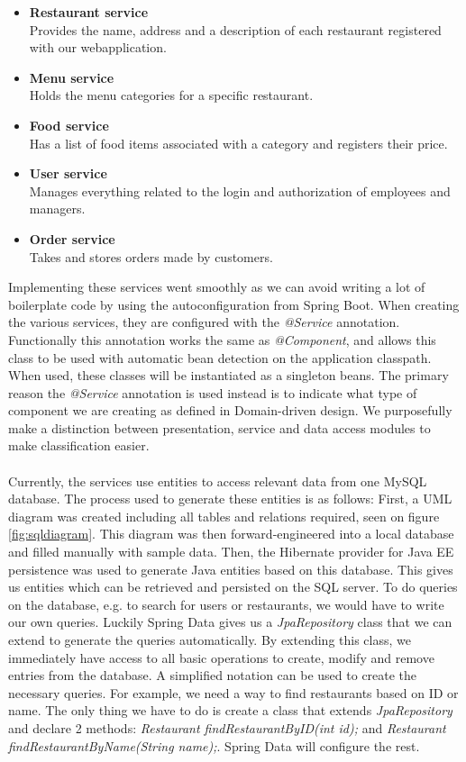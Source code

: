 \documentclass[12pt]{article}
\begin{document}
\begin{multicols}{2}
\begin{itemize}
	\raggedright
	\item \textbf{Restaurant service}\\Provides the name, address and a description of each restaurant registered with our webapplication.
	\item \textbf{Menu service}\\Holds the menu categories for a specific restaurant.
	\item \textbf{Food service}\\Has a list of food items associated with a category and registers their price.
	\item \textbf{User service}\\Manages everything related to the login and authorization of employees and managers.
	\item \textbf{Order service}\\Takes and stores orders made by customers.
\end{itemize} 
Implementing these services went smoothly as we can avoid writing a lot of boilerplate code by using the autoconfiguration from Spring Boot. When creating the various services, they are configured with the \textit{@Service} annotation. Functionally this annotation works the same as \textit{@Component}, and allows this class to be used with automatic bean detection on the application classpath. When used, these classes will be instantiated as a singleton beans. The primary reason the \textit{@Service} annotation is used instead is to indicate what type of component we are creating as defined in Domain-driven design.\cite{ComponentAnnotationDifferences34:online}\cite{ServiceAnnotationSpring48:online} We purposefully make a distinction between presentation, service and data access modules to make classification easier.
\\\\
Currently, the services use entities to access relevant data from one MySQL database. The process used to generate these entities is as follows: First, a UML diagram was created including all tables and relations required, seen on figure \ref{fig:sqldiagram}. This diagram was then forward-engineered into a local database and filled manually with sample data. Then, the Hibernate provider for Java EE persistence was used to generate Java entities based on this database. This gives us entities which can be retrieved and persisted on the SQL server. To do queries on the database, e.g. to search for users or restaurants, we would have to write our own queries. Luckily Spring Data gives us a \textit{JpaRepository} class that we can extend to generate the queries automatically. By extending this class, we immediately have access to all basic operations to create, modify and remove entries from the database. A simplified notation can be used to create the necessary queries. For example, we need a way to find restaurants based on ID or name. The only thing we have to do is create a class that extends \textit{JpaRepository} and declare 2 methods: \textit{Restaurant findRestaurantByID(int id);} and \textit{Restaurant findRestaurantByName(String name);}. Spring Data will configure the rest.

\end{multicols}
\end{document}
